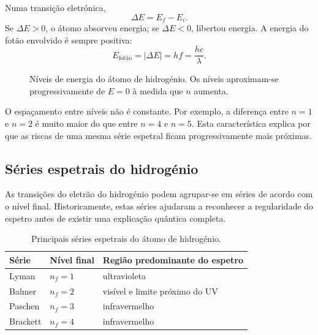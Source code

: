 \documentclass[11pt,a4paper,oneside]{book}
\begin{document}
Numa transição eletrónica,
\[
\Delta E=E_f-E_i.
\]
Se $\Delta E>0$, o átomo absorveu energia; se $\Delta E<0$, libertou energia. A energia do fotão envolvido é sempre positiva:
\[
E_{\text{fotão}}=|\Delta E|=hf=\frac{hc}{\lambda}.
\]

\begin{figure}[H]
\centering
{}
\caption{Níveis de energia do átomo de hidrogénio. Os níveis aproximam-se progressivamente de $E=0$ à medida que $n$ aumenta.}
\end{figure}

\begin{leituragrafico}
O espaçamento entre níveis não é constante. Por exemplo, a diferença entre $n=1$ e $n=2$ é muito maior do que entre $n=4$ e $n=5$. Esta característica explica por que as riscas de uma mesma série espetral ficam progressivamente mais próximas.
\end{leituragrafico}

\subsection*{Séries espetrais do hidrogénio}
As transições do eletrão do hidrogénio podem agrupar-se em séries de acordo com o nível final. Historicamente, estas séries ajudaram a reconhecer a regularidade do espetro antes de existir uma explicação quântica completa.

\begin{table}[H]
\centering
\caption{Principais séries espetrais do átomo de hidrogénio.}
\begin{tabular}{lll}
\toprule
Série & Nível final & Região predominante do espetro \\
\midrule
Lyman & $n_f=1$ & ultravioleta \\
Balmer & $n_f=2$ & visível e limite próximo do UV \\
Paschen & $n_f=3$ & infravermelho \\
Brackett & $n_f=4$ & infravermelho \\
\bottomrule
\end{tabular}
\end{table}
\end{document}
